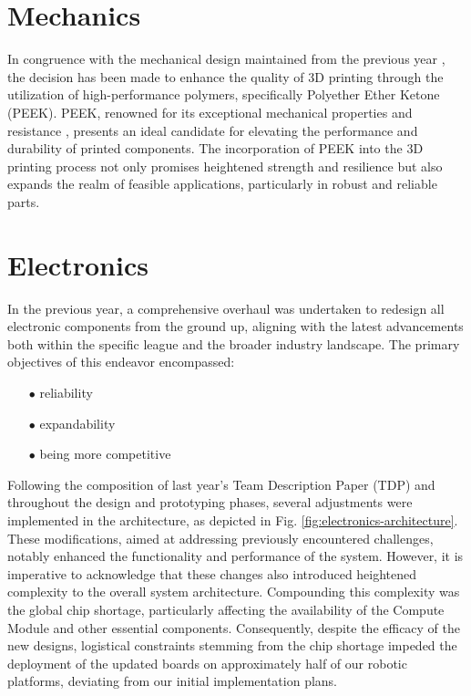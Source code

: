 \documentclass[runningheads]{llncs}
\begin{document}
\section {Mechanics}
In congruence with the mechanical design maintained from the previous year \cite{ref_ETDP2023}, the decision has been made to enhance the quality of 3D printing through the utilization of high-performance polymers, specifically Polyether Ether Ketone (PEEK). PEEK, renowned for its exceptional mechanical properties and resistance \cite{ref_peek}, presents an ideal candidate for elevating the performance and durability of printed components. The incorporation of PEEK into the 3D printing process not only promises heightened strength and resilience but also expands the realm of feasible applications, particularly in robust and reliable parts.

\section{Electronics}

\indent 
In the previous year, a comprehensive overhaul was undertaken to redesign all electronic components from the ground up, aligning with the latest advancements both within the specific league and the broader industry landscape. The primary objectives of this endeavor encompassed:
\begin{enumerate}
    \item[$\bullet$] reliability
    \item[$\bullet$] expandability
    \item[$\bullet$] being more competitive
\end{enumerate}

Following the composition of last year's Team Description Paper (TDP) and throughout the design and prototyping phases, several adjustments were implemented in the architecture, as depicted in Fig. \ref{fig:electronics-architecture}. These modifications, aimed at addressing previously encountered challenges, notably enhanced the functionality and performance of the system. However, it is imperative to acknowledge that these changes also introduced heightened complexity to the overall system architecture. Compounding this complexity was the global chip shortage, particularly affecting the availability of the Compute Module and other essential components. Consequently, despite the efficacy of the new designs, logistical constraints stemming from the chip shortage impeded the deployment of the updated boards on approximately half of our robotic platforms, deviating from our initial implementation plans.
\end{document}
